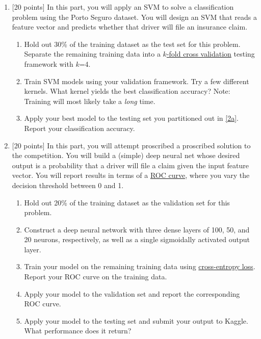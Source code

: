 \documentclass[12pt]{article}
\newenvironment{problem}[2][Problem:]{\begin{trivlist}
\item[\hskip \labelsep {\bfseries #1}\hskip \labelsep {\bfseries #2.}]}{\end{trivlist}}
\begin{document}
\begin{problem}{Porto Seguro Dataset [75 points]}
\begin{enumerate}
    \item {[20 points]} 
    In this part, you will apply an SVM to solve a classification problem using the Porto Seguro dataset.
    You will design an SVM that reads a feature vector and predicts whether that driver will file an insurance claim.
    \begin{enumerate}
    	\item Hold out 30\% of the training dataset as the test set for this problem. Separate the remaining training data into a \href{https://en.wikipedia.org/wiki/Cross-validation_(statistics)#k-fold_cross-validation}{$k$-fold cross validation} testing framework with $k$=4. \label{2a}
    	\item Train SVM models using your validation framework. Try a few different kernels. What kernel yields the best classification accuracy? Note: Training will most likely take a \emph{long} time. 
	\item Apply your best model to the testing set you partitioned out in \ref{2a}. Report your classification accuracy. 
    \end{enumerate}

    \item {[20 points]} \label{3}
    In this part, you will attempt proscribed a proscribed solution to the competition. 
    You will build a (simple) deep neural net whose desired output is a probability that a driver will file a claim given the input feature vector. 
    You will report results in terms of a \href{https://en.wikipedia.org/wiki/Receiver_operating_characteristic}{ROC curve}, where you vary the decision threshold between 0 and 1. 
    \begin{enumerate}
    	\item Hold out 20\% of the training dataset as the validation set for this problem.
    	\item Construct a deep neural network with three dense layers of 100, 50, and 20 neurons, respectively, as well as a single sigmoidally activated output layer.
	\item Train your model on the remaining training data using \href{https://en.wikipedia.org/wiki/Cross_entropy}{cross-entropy loss}. Report your ROC curve on the training data.
	\item Apply your model to the validation set and report the corresponding ROC curve. 
	\item Apply your model to the testing set and submit your output to Kaggle. What performance does it return?
    \end{enumerate}


\end{enumerate}
\end{problem}
\end{document}
